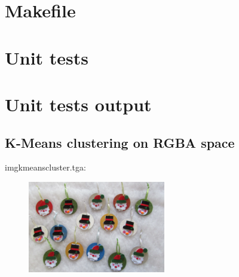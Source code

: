 \section{Makefile}

\begin{scriptsize}
\begin{ttfamily}

\end{ttfamily}
\end{scriptsize}

\section{Unit tests}

\begin{scriptsize}
\begin{ttfamily}

\end{ttfamily}
\end{scriptsize}

\section{Unit tests output}

\begin{scriptsize}
\begin{ttfamily}

\end{ttfamily}
\end{scriptsize}

\subsection{K-Means clustering on RGBA space}

imgkmeanscluster.tga:\\
\begin{center}
\begin{figure}[H]
\centering\includegraphics[width=6cm]{./imgkmeanscluster.png}\\
\end{figure}
\end{center}

